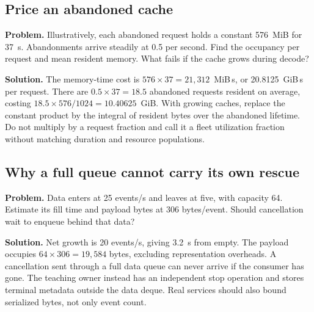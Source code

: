 \begin{minipage}{\linewidth}
\subsection{Price an abandoned cache}
\textbf{Problem.} Illustratively, each abandoned request holds a constant
576~MiB for 37~s. Abandonments arrive steadily at 0.5 per second.
Find the occupancy per request and mean resident memory. What fails if the
cache grows during decode?

\textbf{Solution.} The memory-time cost is
$576\times37=21{,}312$~MiB\,s, or 20.8125~GiB\,s per request.
There are $0.5\times37=18.5$ abandoned requests resident on average, costing
$18.5\times576/1024=10.40625$~GiB. With growing caches, replace the constant
product by the integral of resident bytes over the abandoned lifetime.
Do not multiply by a request fraction and call it a fleet utilization
fraction without matching duration and resource populations.
\end{minipage}\par

\begin{minipage}{\linewidth}
\subsection{Why a full queue cannot carry its own rescue}
\textbf{Problem.} Data enters at 25 events/s and leaves at five, with
capacity 64. Estimate its fill time and payload bytes at 306 bytes/event.
Should cancellation wait to enqueue behind that data?

\textbf{Solution.} Net growth is 20 events/s, giving 3.2~s from empty.
The payload occupies $64\times306=19{,}584$ bytes, excluding representation
overheads. A cancellation sent through a full data queue can never arrive
if the consumer has gone. The teaching owner instead has an independent
stop operation and stores terminal metadata outside the data deque.
Real services should also bound serialized bytes, not only event count.
\end{minipage}\par

